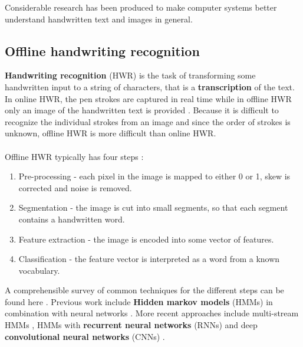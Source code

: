 Considerable research has been produced to make computer systems better understand handwritten text and images in general.

\subsection{Offline handwriting recognition}


\textbf{Handwriting recognition} (HWR) is the task of transforming some handwritten input to a string of characters, that is a \textbf{transcription} of the text.
In online HWR, the pen strokes are captured in real time while in offline HWR only an image of the handwritten text is provided \cite{offline_HWR_CNN}. Because it is difficult to recognize the individual strokes from an image and since the order of strokes is unknown, offline HWR is more difficult than online HWR.

\paragraph{}
Offline HWR typically has four steps \cite{offline_HWR_CNN}:
\begin{enumerate}
    \item Pre-processing - each pixel in the image is mapped to either 0 or 1, skew is corrected and noise is removed.
    \item Segmentation - the image is cut into small segments, so that each segment contains a handwritten word.
    \item Feature extraction - the image is encoded into some vector of features.
    \item Classification - the feature vector is interpreted as a word from a known vocabulary.
\end{enumerate}

A comprehensible survey of common techniques for the different steps can be found here \cite{HWR_survey}.
Previous work include \textbf{Hidden markov models} (HMMs) in combination with neural networks \cite{Offline_HWR_HMM_ANN}.
More recent approaches include multi-stream HMMs \cite{HWR_multi_stream_HMM_arabic}, HMMs with \textbf{recurrent neural networks} (RNNs) \cite{Offline_HWR_RNN} and deep \textbf{convolutional neural networks} (CNNs) \cite{offline_HWR_CNN}.

